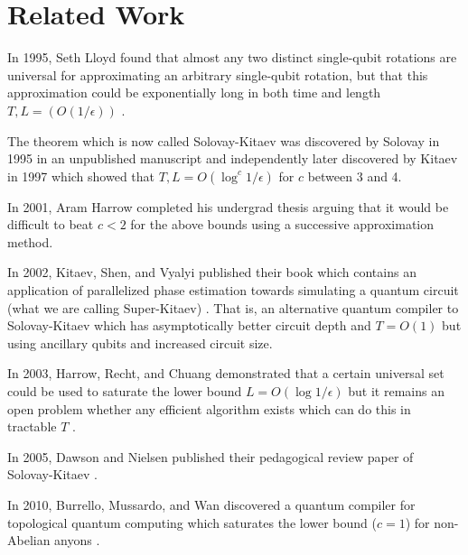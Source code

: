 \section{Related Work}
\label{sec:related}

In 1995, Seth Lloyd found that almost any two distinct single-qubit rotations are
universal for approximating an arbitrary single-qubit rotation, but that this
approximation could be exponentially long in both time and length $T,L = (O(1/\epsilon))$ \cite{Lloyd1995}.

The theorem which is now called Solovay-Kitaev was discovered by Solovay in
1995 in an unpublished manuscript and independently later discovered by
Kitaev in 1997 \cite{nc00} which showed that $T,L = O(\log^c{1/\epsilon})$ for
$c$ between 3 and 4.

In 2001, Aram Harrow completed his undergrad thesis arguing that it would be difficult
to beat $c < 2$ for the above bounds using a successive approximation
method\cite{harrow01}.

In 2002, Kitaev, Shen, and Vyalyi published their book which contains an
application of parallelized phase estimation towards simulating a quantum
circuit (what we are calling Super-Kitaev) \cite{ksv02}.
That is, an alternative quantum compiler to Solovay-Kitaev which has
asymptotically better circuit depth and $T=O(1)$
but using ancillary qubits and increased
circuit size.

In 2003, Harrow, Recht, and Chuang demonstrated that a certain universal
set could be used to saturate the lower bound $L=O(\log{1/\epsilon})$
but it remains an open problem whether any efficient algorithm exists
which can do this in tractable $T$ \cite{hrc02}.

In 2005, Dawson and Nielsen published their pedagogical review
paper of Solovay-Kitaev \cite{Dawson2005}.

In 2010, Burrello, Mussardo, and Wan discovered a quantum compiler for
topological quantum computing which saturates the lower bound ($c=1$) for
non-Abelian anyons \cite{Burrello2010}.